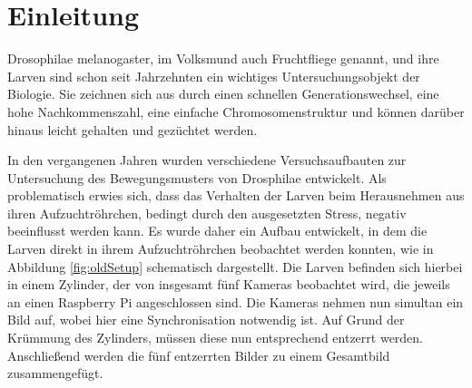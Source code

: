 \chapter{Einleitung}
Drosophilae melanogaster, im Volksmund auch Fruchtfliege genannt, und ihre Larven sind schon seit Jahrzehnten ein wichtiges Untersuchungsobjekt der Biologie. Sie zeichnen sich aus durch einen schnellen Generationswechsel, eine hohe Nachkommenszahl, eine einfache Chromosomenstruktur und können darüber hinaus leicht gehalten und gezüchtet werden.

In den vergangenen Jahren wurden verschiedene Versuchsaufbauten zur Untersuchung des Bewegungsmusters von Drosphilae entwickelt.
Als problematisch erwies sich, dass das Verhalten der Larven beim Herausnehmen aus ihren Aufzuchtröhrchen, bedingt durch den ausgesetzten Stress, negativ beeinflusst werden kann.
Es wurde daher ein Aufbau entwickelt, in dem die Larven direkt in ihrem Aufzuchtröhrchen beobachtet werden konnten, wie in Abbildung \ref{fig:oldSetup} schematisch dargestellt.
Die Larven befinden sich hierbei in einem Zylinder, der von insgesamt fünf Kameras beobachtet wird, die jeweils an einen Raspberry Pi angeschlossen sind. Die Kameras nehmen nun simultan ein Bild auf, wobei hier eine Synchronisation notwendig ist. Auf Grund der Krümmung des Zylinders, müssen diese nun entsprechend entzerrt werden. Anschließend werden die fünf entzerrten Bilder zu einem Gesamtbild zusammengefügt.
